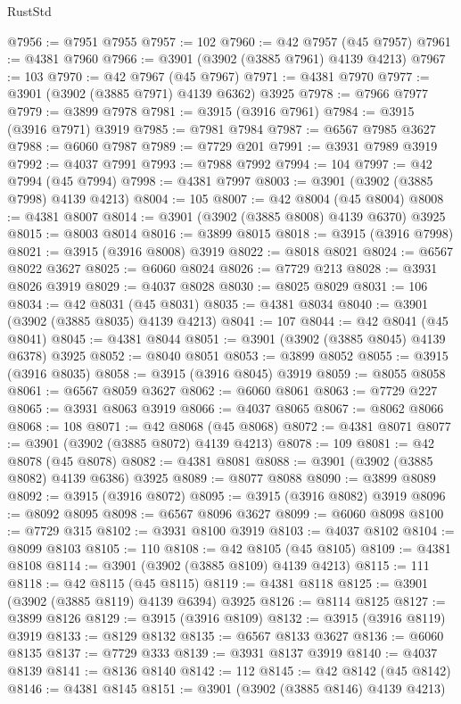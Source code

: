 \begin{lexlean}{RustStd}
\begin{coremodule}
@7956 := @7951 @7955
@7957 := 102
@7960 := @42 @7957 (@45 @7957)
@7961 := @4381 @7960
@7966 := @3901 (@3902 (@3885 @7961) @4139 @4213)
@7967 := 103
@7970 := @42 @7967 (@45 @7967)
@7971 := @4381 @7970
@7977 := @3901 (@3902 (@3885 @7971) @4139 @6362) @3925
@7978 := @7966 @7977
@7979 := @3899 @7978
@7981 := @3915 (@3916 @7961)
@7984 := @3915 (@3916 @7971) @3919
@7985 := @7981 @7984
@7987 := @6567 @7985 @3627
@7988 := @6060 @7987
@7989 := @7729 @201
@7991 := @3931 @7989 @3919
@7992 := @4037 @7991
@7993 := @7988 @7992
@7994 := 104
@7997 := @42 @7994 (@45 @7994)
@7998 := @4381 @7997
@8003 := @3901 (@3902 (@3885 @7998) @4139 @4213)
@8004 := 105
@8007 := @42 @8004 (@45 @8004)
@8008 := @4381 @8007
@8014 := @3901 (@3902 (@3885 @8008) @4139 @6370) @3925
@8015 := @8003 @8014
@8016 := @3899 @8015
@8018 := @3915 (@3916 @7998)
@8021 := @3915 (@3916 @8008) @3919
@8022 := @8018 @8021
@8024 := @6567 @8022 @3627
@8025 := @6060 @8024
@8026 := @7729 @213
@8028 := @3931 @8026 @3919
@8029 := @4037 @8028
@8030 := @8025 @8029
@8031 := 106
@8034 := @42 @8031 (@45 @8031)
@8035 := @4381 @8034
@8040 := @3901 (@3902 (@3885 @8035) @4139 @4213)
@8041 := 107
@8044 := @42 @8041 (@45 @8041)
@8045 := @4381 @8044
@8051 := @3901 (@3902 (@3885 @8045) @4139 @6378) @3925
@8052 := @8040 @8051
@8053 := @3899 @8052
@8055 := @3915 (@3916 @8035)
@8058 := @3915 (@3916 @8045) @3919
@8059 := @8055 @8058
@8061 := @6567 @8059 @3627
@8062 := @6060 @8061
@8063 := @7729 @227
@8065 := @3931 @8063 @3919
@8066 := @4037 @8065
@8067 := @8062 @8066
@8068 := 108
@8071 := @42 @8068 (@45 @8068)
@8072 := @4381 @8071
@8077 := @3901 (@3902 (@3885 @8072) @4139 @4213)
@8078 := 109
@8081 := @42 @8078 (@45 @8078)
@8082 := @4381 @8081
@8088 := @3901 (@3902 (@3885 @8082) @4139 @6386) @3925
@8089 := @8077 @8088
@8090 := @3899 @8089
@8092 := @3915 (@3916 @8072)
@8095 := @3915 (@3916 @8082) @3919
@8096 := @8092 @8095
@8098 := @6567 @8096 @3627
@8099 := @6060 @8098
@8100 := @7729 @315
@8102 := @3931 @8100 @3919
@8103 := @4037 @8102
@8104 := @8099 @8103
@8105 := 110
@8108 := @42 @8105 (@45 @8105)
@8109 := @4381 @8108
@8114 := @3901 (@3902 (@3885 @8109) @4139 @4213)
@8115 := 111
@8118 := @42 @8115 (@45 @8115)
@8119 := @4381 @8118
@8125 := @3901 (@3902 (@3885 @8119) @4139 @6394) @3925
@8126 := @8114 @8125
@8127 := @3899 @8126
@8129 := @3915 (@3916 @8109)
@8132 := @3915 (@3916 @8119) @3919
@8133 := @8129 @8132
@8135 := @6567 @8133 @3627
@8136 := @6060 @8135
@8137 := @7729 @333
@8139 := @3931 @8137 @3919
@8140 := @4037 @8139
@8141 := @8136 @8140
@8142 := 112
@8145 := @42 @8142 (@45 @8142)
@8146 := @4381 @8145
@8151 := @3901 (@3902 (@3885 @8146) @4139 @4213)

\end{coremodule}
\end{lexlean}
